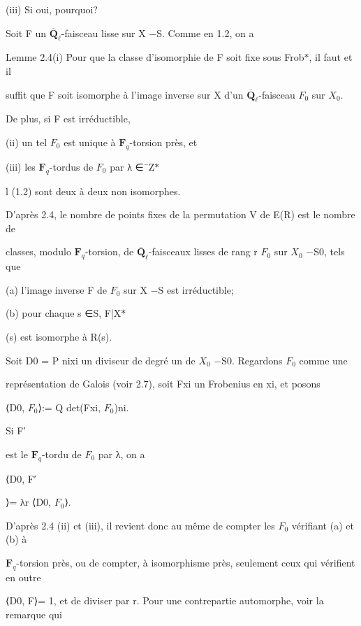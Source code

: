 \documentclass[11pt]{article}
\begin{document}
\noindent (iii) Si oui, pourquoi?\par
\noindent Soit F un \(\overline{\mathbf Q}_{\ell}\)-faisceau lisse sur X −S. Comme en 1.2, on a\par
\noindent Lemme 2.4(i) Pour que la classe d’isomorphie de F soit fixe sous Frob\(*\), il faut et il\par
\noindent suffit que F soit isomorphe à l’image inverse sur X d’un \(\overline{\mathbf Q}_{\ell}\)-faisceau \(F_0\) sur \(X_0\).\par
\noindent De plus, si F est irréductible,\par
\noindent (ii) un tel \(F_0\) est unique à \(\mathbf F_q\)-torsion près, et\par
\noindent (iii) les \(\mathbf F_q\)-tordus de \(F_0\) par λ ∈¯Z\(*\)\par
\noindent l (1.2) sont deux à deux non isomorphes.\par
\noindent D’après 2.4, le nombre de points fixes de la permutation V de E(R) est le nombre de\par
\noindent classes, modulo \(\mathbf F_q\)-torsion, de \(\overline{\mathbf Q}_{\ell}\)-faisceaux lisses de rang r \(F_0\) sur \(X_0\) −S0, tels que\par
\noindent (a) l’image inverse F de \(F_0\) sur X −S est irréductible;\par
\noindent (b) pour chaque s ∈S, F|X\(*\)\par
\noindent (s) est isomorphe à R(s).\par
\noindent Soit D0 = P nixi un diviseur de degré un de \(X_0\) −S0. Regardons \(F_0\) comme une\par
\noindent représentation de Galois (voir 2.7), soit Fxi un Frobenius en xi, et posons\par
\noindent ⟨D0, \(F_0\)⟩:= Q det(Fxi, \(F_0\))ni.\par
\medskip
\noindent Si F′\par
{} est le \(\mathbf F_q\)-tordu de \(F_0\) par λ, on a\par
\noindent ⟨D0, F′\par
{}⟩= λr ⟨D0, \(F_0\)⟩.\par
\noindent D’après 2.4 (ii) et (iii), il revient donc au même de compter les \(F_0\) vérifiant (a) et (b) à\par
\noindent \(\mathbf F_q\)-torsion près, ou de compter, à isomorphisme près, seulement ceux qui vérifient en outre\par
\noindent ⟨D0, F⟩= 1, et de diviser par r. Pour une contrepartie automorphe, voir la remarque qui\par
\end{document}
